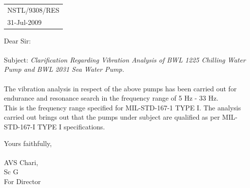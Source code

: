 \documentclass[11pt,A4]{article}
\begin{document}
\vspace*{-1.8cm}
\begin{flushright}
\begin{tabular}{l}
NSTL/9308/RES \\
31-Jul-2009\\
\end{tabular}
\end{flushright}
\vspace*{2.1cm}
\large


\noindent Dear Sir: \\\\

\noindent Subject: {\em Clarification Regarding Vibration Analysis of BWL 1225 Chilling Water Pump and BWL 2031 Sea Water Pump.}\\\\


         The vibration analysis in respect of the above pumps has been carried out for endurance and resonance search in the frequency range of 5 Hz - 33 Hz.\\
         
         This is the frequency range specified for MIL-STD-167-1 TYPE I. The analysis carried out brings out that the pumps under subject are qualified as per MIL-STD-167-I TYPE I specifications.


\vspace*{1cm}
\noindent Yours faithfully,\\\\

\vspace*{0.5cm}
\noindent AVS Chari,\\
 Sc G\\
\noindent For Director
\end{document}
